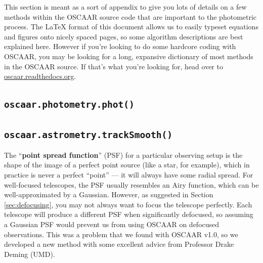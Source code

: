 \documentclass[a4paper]{article}
\newcommand{\code}[1]{\texttt{#1}}
\begin{document}
This section is meant as a sort of appendix to give you lots of details on a few methods within the OSCAAR source code that are important to the photometric process. The LaTeX format of this document allows us to easily typeset equations and figures onto nicely spaced pages, so some algorithm descriptions are best explained here. However if you're looking to do some hardcore coding with OSCAAR, you may be looking for a long, expansive dictionary of most methods in the OSCAAR source. If that's what you're looking for, head over to \href{http://oscaar.readthedocs.org/}{oscaar.readthedocs.org}.

\subsection{\code{oscaar.photometry.phot()}}


\subsection{\code{oscaar.astrometry.trackSmooth()}} \label{sec:trackSmooth}
The ``\textbf{point spread function}'' (PSF) for a particular observing setup is the shape of the image of a perfect point source (like a star, for example), which in practice is never a perfect ``point'' --- it will always have some radial spread. For well-focused telescopes, the PSF usually resembles an Airy function, which can be well-approximated by a Gaussian. However, as suggested in Section \ref{sec:defocusing}, you may not always want to focus the telescope perfectly. Each telescope will produce a different PSF when significantly defocused, so assuming a Gaussian PSF would prevent us from using OSCAAR on defocused observations. This was a problem that we found with OSCAAR v1.0, so we developed a new method with some excellent advice from Professor Drake Deming (UMD).
\end{document}
